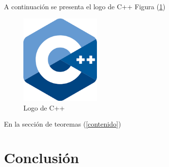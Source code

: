 \documentclass{article}
\begin{document}
A continuación se presenta el logo de C++ Figura (\ref{fig:cpplogo})

\begin{figure}[h]
\includegraphics[width=4cm]{cpplogo.png}
\centering
\caption{Logo de C++}
\label{fig:cpplogo}
\end{figure}

En la sección de teoremas (\ref{contenido})


\section{Conclusión} \label{conclulsion}



\end{document}

